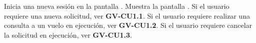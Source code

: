 
\begin{UCtrayectoria}
	\UCpaso [\UCactor] Inicia una nueva sesión en la pantalla .
	\UCpaso Muestra la pantalla .
	\UCpaso Si el usuario requiere una nueva solicitud, ver \textbf{GV-CU1.1}.
	\UCpaso Si el usuario requiere realizar una consulta a un vuelo en ejecución, ver \textbf{GV-CU1.2}.
	\UCpaso Si el usuario requiere cancelar la solicitud en ejecución, ver \textbf{GV-CU1.3}.
\end{UCtrayectoria}










